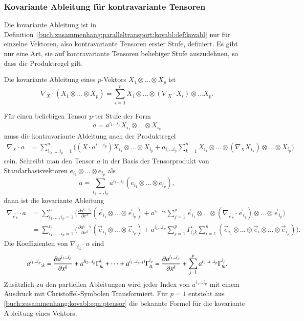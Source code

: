 %
%
\subsubsection{Kovariante Ableitung für kontravariante Tensoren}
Die kovariante Ableitung ist in
Definition~\ref{buch:zusammenhang:paralleltransport:kovabl:def:kovabl}
nur für einzelne Vektoren, also kontravariante Tensoren erster Stufe,
definiert.
Es gibt nur eine Art, sie auf kontravariante Tensoren beliebiger Stufe
auszudehnen, so dass die Produktregel gilt.

\begin{definition}
\label{buch:zusammenhang:parallel:def:kovablvektor}
Die kovariante Ableitung eines $p$-Vektors $X_1\otimes\dots\otimes X_p$
ist
\[
\nabla_X\cdot (X_1\otimes\dots\otimes X_p)
=
\sum_{i=1}^p
X_1\otimes\dots\otimes(\nabla_X\cdot X_i)\otimes\dots X_p.
\]
\end{definition}

Für einen beliebigen Tensor $p$-ter Stufe der Form
\[
a
=
a^{i_1\dots i_p}
X_{i_1}\otimes\dots\otimes X_{i_p}
\]
muss die kontravariante Ableitung nach der Produktregel
\begin{align*}
\nabla_X\cdot a
&=
\sum_{i_1,\dots,i_p=1}^n
\biggl(
(X\cdot a^{i_1\dots i_p}) X_{i_1}\otimes\dots\otimes X_{i_p}
+
a_{i_1\dots i_p}
\sum_{k=1}^n
X_{i_1}\otimes\dots\otimes(\nabla_X X_{i_k})\otimes\dots\otimes X_{i_p}
\biggr)
\end{align*}
sein.
Schreibt man den Tensor $a$ in der Basis der Tensorprodukt von
Standarbasisvektoren $e_{i_1}\otimes\dots\otimes e_{i_p}$ als
\[
a
=
\sum_{i_1,\dots,i_p}
a^{i_1\dots i_p}
(e_{i_1}\otimes\dots\otimes e_{i_p}),
\]
dann ist die kovariante Ableitung
\begin{align*}
\nabla_{\vec{e}_k} \cdot a
&=
\sum_{i_1,\dots,i_p=1}^n
\biggl(
\frac{\partial a^{i_1\dots i_p}}{\partial x^k}
(\vec{e}_{i_1}\otimes\dots\otimes\vec{e}_{i_p})
+
a^{i_1\dots i_p}
\sum_{j=1}^p
\vec{e}_{i_1}\otimes\dots\otimes(\nabla_{\vec{e}_k}\cdot\vec{e}_{i_j})\otimes\dots\otimes \vec{e}_{i_p}
\biggr)
\\
&=
\sum_{i_1,\dots,i_p=1}^n
\biggl(
\frac{\partial a^{i_1\dots i_p}}{\partial x^k}
(\vec{e}_{i_1}\otimes\dots\otimes\vec{e}_{i_p})
+
a^{i_1\dots i_p}
\sum_{j=1}^p
\Gamma^i_{i_jk}
\sum_{i=1}^n
(\vec{e}_{i_1}\otimes\dots\otimes \vec{e}_i \otimes\dots\otimes \vec{e}_{i_p})
\biggr).
\end{align*}
Die Koeffizienten von $\nabla_{\vec{e}_k}\cdot a$ sind
\begin{equation}
a^{i_1\dots i_p}\mathstrut_{;k}
=
\frac{\partial a^{i_1\dots i_p}}{\partial x^k}
+
a^{li_2\dots i_p}
\Gamma^{i_1}_{lk}
+
\dots
+
a^{i_1\dots i_{p-1}l}
\Gamma^{i_p}_{lk}
=
\frac{\partial a^{i_1\dots i_p}}{\partial x^k}
+
\sum_{j=1}^p
a^{i_1\dots l\dots i_p}
\Gamma^{i_j}_{lk}.
\label{buch:zusammenhang:kovabl:eqn:ptensor}
\end{equation}
Zusätzlich zu den partiellen Ableitungen wird jeder Index von
$a^{i_1\dots i_p}$ mit einem Ausdruck mit Christoffel-Symbolen
Transformiert.
Für $p=1$ entsteht aus 
\eqref{buch:zusammenhang:kovabl:eqn:ptensor}
die bekannte Formel für die kovariante Ableitung eines Vektors.

